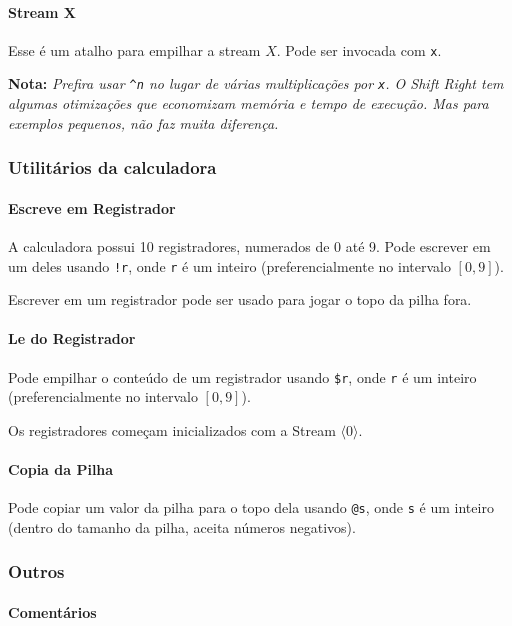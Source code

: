 \documentclass{article}
\newcommand{\note}[1]{\textbf{Nota:} \textit{#1}}
\newcommand{\ins}[1]{\langle #1 \rangle}
\begin{document}
\paragraph{Stream X}

Esse é um atalho para empilhar a stream \(X\).
Pode ser invocada com \texttt{x}.

\note{Prefira usar \texttt{\textasciicircum{}n}
no lugar de várias multiplicações por \texttt{x}.
O \emph{Shift Right} tem algumas otimizações
que economizam memória e tempo de execução.
Mas para exemplos pequenos, não faz muita diferença.}

\subsubsection{Utilitários da calculadora}
\paragraph{Escreve em Registrador}

A calculadora possui 10 registradores,
numerados de 0 até 9.
Pode escrever em um deles usando \texttt{!r},
onde \texttt{r} é um inteiro (preferencialmente no intervalo \([0 , 9]\)).

Escrever em um registrador pode ser usado
para jogar o topo da pilha fora.

\paragraph{Le do Registrador}

Pode empilhar o conteúdo de um registrador usando \texttt{\$r},
onde \texttt{r} é um inteiro (preferencialmente no intervalo \([0 , 9]\)).

Os registradores começam inicializados com a Stream \(\ins{0}\).

\paragraph{Copia da Pilha}

Pode copiar um valor da pilha para o topo dela usando \texttt{@s},
onde \texttt{s} é um inteiro (dentro do tamanho da pilha,
aceita números negativos).

\subsubsection{Outros}
\paragraph{Comentários}
\end{document}
